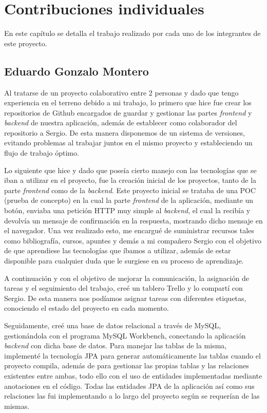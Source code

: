 \chapter{Contribuciones individuales}

En este capítulo se detalla el trabajo realizado por cada uno de los integrantes de este proyecto.

\section{Eduardo Gonzalo Montero}

Al tratarse de un proyecto colaborativo entre 2 personas y dado que tengo experiencia en el terreno debido a mi trabajo, lo primero que hice fue crear los repositorios de Github encargados de guardar y gestionar las partes \textit{frontend} y \textit{backend} de nuestra aplicación, además de establecer como colaborador del repositorio a Sergio. De esta manera disponemos de un sistema de versiones, evitando problemas al trabajar juntos en el mismo proyecto y estableciendo un flujo de trabajo óptimo. \newline

Lo siguiente que hice y dado que poseía cierto manejo con las tecnologías que se iban a utilizar en el proyecto, fue la creación inicial de los proyectos, tanto de la parte \textit{frontend} como de la  \textit{backend}. Este proyecto inicial se trataba de una POC (prueba de concepto) en la cual la parte \textit{frontend} de la aplicación, mediante un botón, enviaba una petición HTTP muy simple al \textit{backend}, el cual la recibía y devolvía un mensaje de confirmación en la respuesta, mostrando dicho mensaje en el navegador. Una vez realizado esto, me encargué de suministrar recursos tales como bibliografía, cursos, apuntes y demás a mi compañero Sergio con el objetivo de que aprendiese las tecnologías que íbamos a utilizar, además de estar disponible para cualquier duda que le surgiese en su proceso de aprendizaje. \newline

A continuación y con el objetivo de mejorar la comunicación, la asignación de tareas y el seguimiento del trabajo, creé un tablero Trello y lo compartí con Sergio. De esta manera nos podíamos asignar tareas con diferentes etiquetas, conociendo el estado del proyecto en cada momento. \newline

Seguidamente, creé una base de datos relacional a través de MySQL, gestionándola con el programa MySQL Workbench, conectando la aplicación \textit{backend} con dicha base de datos. Para manejar las tablas de la misma, implementé la tecnología JPA para generar automáticamente las tablas cuando el proyecto compila, además de para gestionar las propias tablas y las relaciones existentes entre ambas, todo ello con el uso de  entidades implementadas mediante anotaciones en el código. Todas las entidades JPA de la aplicación así como sus relaciones las fui implementando a lo largo del proyecto según se requerían de las mismas. \newline


